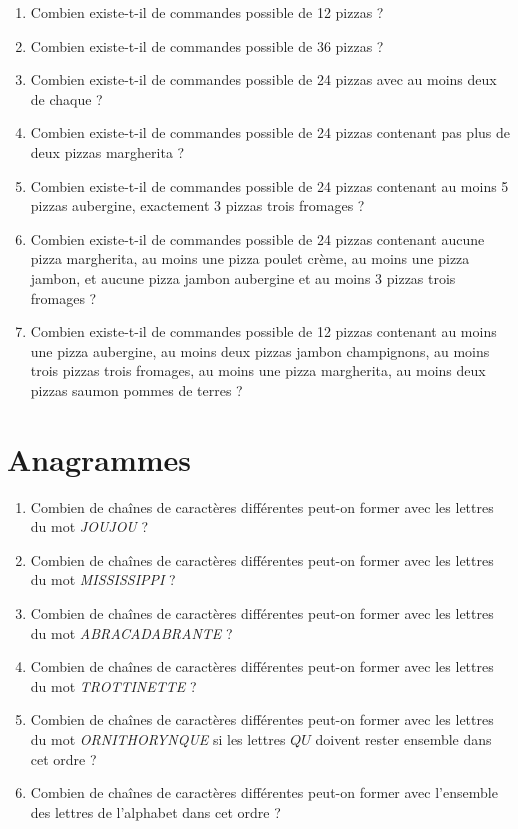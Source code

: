 \documentclass[a4paper,11pt]{article}
\begin{document}
\begin{enumerate}
\item Combien existe-t-il de commandes possible de 12 pizzas ?

\item Combien existe-t-il de commandes possible de 36 pizzas ?

\item Combien existe-t-il de commandes possible de 24 pizzas avec au moins deux de chaque ?

\item Combien existe-t-il de commandes possible de 24 pizzas contenant pas plus de deux pizzas margherita ?

\item Combien existe-t-il de commandes possible de 24 pizzas contenant au moins 5 pizzas aubergine, exactement 3 pizzas trois fromages ?

\item Combien existe-t-il de commandes possible de 24 pizzas contenant aucune pizza margherita, au moins une pizza poulet crème, au moins une pizza jambon, et aucune pizza jambon aubergine et au moins 3 pizzas trois fromages ?

\item Combien existe-t-il de commandes possible de 12 pizzas contenant au moins une pizza aubergine, au moins deux pizzas jambon champignons, au moins trois pizzas trois fromages, au moins une pizza margherita, au moins deux pizzas saumon pommes de terres ?
\end{enumerate}

\section{Anagrammes}

\begin{enumerate}
\item Combien de chaînes de caractères différentes peut-on former avec les lettres du mot \emph{JOUJOU} ?

\item Combien de chaînes de caractères différentes peut-on former avec les lettres du mot \emph{MISSISSIPPI} ?

\item Combien de chaînes de caractères différentes peut-on former avec les lettres du mot \emph{ABRACADABRANTE} ?

\item Combien de chaînes de caractères différentes peut-on former avec les lettres du mot \emph{TROTTINETTE} ?

\item Combien de chaînes de caractères différentes peut-on former avec les lettres du mot \emph{ORNITHORYNQUE} si les lettres $QU$ doivent rester ensemble dans cet ordre ?

\item Combien de chaînes de caractères différentes peut-on former avec l'ensemble des lettres de l'alphabet dans cet ordre ?
\end{enumerate}
\end{document}
